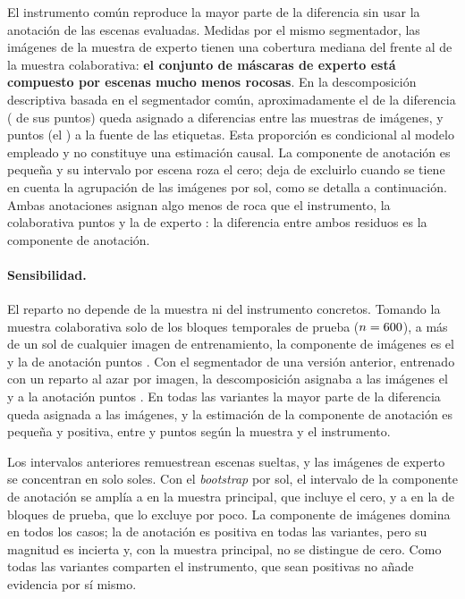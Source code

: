 El instrumento común reproduce la mayor parte de la diferencia sin usar la anotación de las
escenas evaluadas.
Medidas por el mismo segmentador, las imágenes de la muestra de experto tienen una cobertura
mediana del \cFARegMedExp{} frente al \cFARegMedColab{} de la muestra colaborativa: \textbf{el
conjunto de máscaras de experto está compuesto por escenas mucho menos rocosas}. En la
descomposición descriptiva basada en el segmentador común, aproximadamente el \cDescImgPct{} de
la diferencia (\cDescImg{} de sus \cDescTotal{} puntos) queda asignado a diferencias entre las
muestras de imágenes, y \cDescAnot{} puntos (el \cDescAnotPct) a la fuente de las etiquetas.
Esta proporción es condicional al modelo empleado y no constituye una estimación causal. La
componente de anotación es pequeña y su intervalo por escena roza el cero; deja
de excluirlo cuando se tiene en cuenta la agrupación de las imágenes por sol, como se detalla a
continuación. Ambas
anotaciones asignan algo menos de roca que el instrumento, la colaborativa \cResColab{} puntos y
la de experto \cResExp: la diferencia entre ambos residuos es la componente de anotación.

\paragraph{Sensibilidad.} El reparto no depende de la muestra ni del instrumento concretos.
Tomando la muestra colaborativa solo de los bloques temporales de prueba ($n = \num{600}$), a más
de un sol de cualquier imagen de entrenamiento, la componente de imágenes es el \cFPDescImgPct{}
y la de anotación \cFPDescAnot{} puntos \cFPDescAnotIC. Con el segmentador de una versión
anterior, entrenado con un reparto al azar por imagen, la descomposición asignaba a las imágenes
el \cFVDescImgPct{} y a la anotación \cFVDescAnot{} puntos \cFVDescAnotIC. En todas las
variantes la mayor parte de la diferencia queda asignada a las imágenes, y la estimación de la
componente de anotación es pequeña y positiva, entre \cDescAnot{} y \cFVDescAnot{} puntos según
la muestra y el instrumento.

Los intervalos anteriores remuestrean escenas sueltas, y las imágenes de experto se concentran
en solo \cTempNSolesExp{} soles. Con el \textit{bootstrap} por sol, el intervalo de la componente
de anotación se amplía a \cTempAnotIC{} en la muestra principal, que incluye el cero, y a
\cTempAnotPruebaIC{} en la de bloques de prueba, que lo excluye por poco. La componente de
imágenes domina en todos los casos; la de anotación es positiva en todas las variantes, pero su
magnitud es incierta y, con la muestra principal, no se distingue de cero. Como todas las
variantes comparten el instrumento, que sean positivas no añade evidencia por sí mismo.

